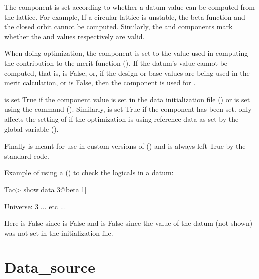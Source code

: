 The  component is set according to whether a datum
value can be computed from the  lattice. For example, If a
circular lattice is unstable, the beta function and the closed orbit
cannot be computed. Similarly, the  and 
components mark whether the  and  values
respectively are valid.

When doing optimization, the  component is set to the
 value used in computing the contribution to the merit
function (). If the datum's value cannot be
computed, that is,  is False, or, if the design or base
values are being used in the merit calculation,  or
 is False, then the  component is used for
.

 is set True if the  component value is set in
the data initialization file () or is set using the
 command (). Similarly,  is set True
if the  component has been set.  only affects the
setting of  if the optimization is using reference data
as set by the global variable  ().

Finally  is meant for use in custom versions of \tao
() and is always left True by the standard \tao code.

Example of using a  () to check the logicals
in a datum:
\begin{example}
  Tao> show data 3@beta[1]

  Universe:   3
      ... etc ...
\end{example}
Here  is False since  is False and
 is False since the  value of the datum (not
shown) was not set in the \tao initialization file.

\section{Data_source}
\label{s:data.source}


